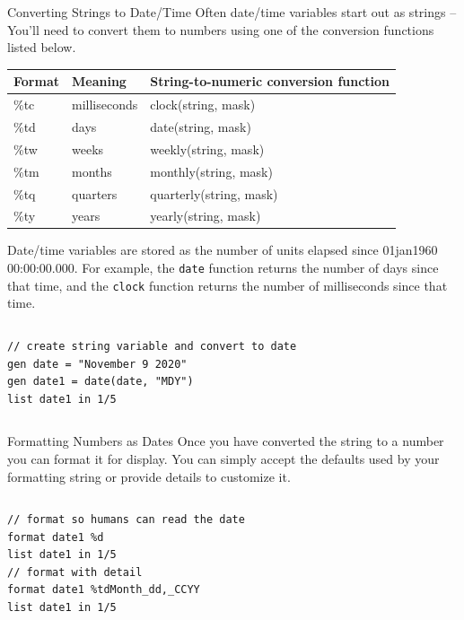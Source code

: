 \documentclass[table,smaller]{beamer}
\begin{document}
\begin{frame}[fragile,label=sec-5-3]{Converting Strings to Date/Time}
 Often date/time variables start out as strings -- You'll need to convert them to numbers using one of the conversion functions listed below.

\begin{center}
\begin{tabular}{lll}
Format & Meaning & String-to-numeric conversion function\\
\hline
\%tc & milliseconds & clock(string, mask)\\
\%td & days & date(string, mask)\\
\%tw & weeks & weekly(string, mask)\\
\%tm & months & monthly(string, mask)\\
\%tq & quarters & quarterly(string, mask)\\
\%ty & years & yearly(string, mask)\\
\hline
\end{tabular}
\end{center}

Date/time variables are stored as the number of units elapsed since 01jan1960 00:00:00.000. For example, the \verb~date~ function returns the number of days since that time, and the \verb~clock~ function returns the number of milliseconds since that time.

\vspace{-.5em} \begin{columns}  \begin{block}{}
\begin{verbatim}
// create string variable and convert to date
gen date = "November 9 2020"
gen date1 = date(date, "MDY")
list date1 in 1/5
\end{verbatim}
\end{block} \end{columns}
\end{frame}
\begin{frame}[fragile,label=sec-5-4]{Formatting Numbers as Dates}
 Once you have converted the string to a number you can format it for display. You can simply accept the defaults used by your formatting string or provide details to customize it.

\vspace{-.5em} \begin{columns}  \begin{block}{}
\begin{verbatim}
// format so humans can read the date
format date1 %d
list date1 in 1/5
// format with detail
format date1 %tdMonth_dd,_CCYY
list date1 in 1/5
\end{verbatim}
\end{block} \end{columns}
\end{frame}
\end{document}
